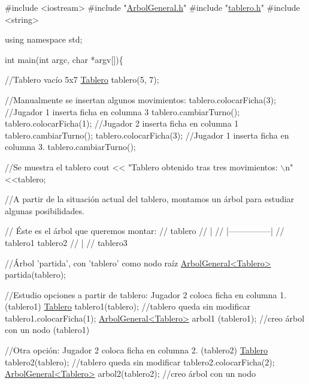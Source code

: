 \begin{DoxyCode}
\textcolor{preprocessor}{#include <iostream>}
\textcolor{preprocessor}{#include "\hyperlink{ArbolGeneral_8h}{ArbolGeneral.h}"}
\textcolor{preprocessor}{#include "\hyperlink{tablero_8h}{tablero.h}"}
\textcolor{preprocessor}{#include <string>}

\textcolor{keyword}{using namespace }std;


\textcolor{keywordtype}{int} main(\textcolor{keywordtype}{int} argc, \textcolor{keywordtype}{char} *argv[])\{

  \textcolor{comment}{//Tablero vacío 5x7}
    \hyperlink{classTablero}{Tablero} tablero(5, 7);

    \textcolor{comment}{//Manualmente se insertan algunos movimientos: }
    tablero.colocarFicha(3);  \textcolor{comment}{//Jugador 1 inserta ficha en columna 3}
    tablero.cambiarTurno();
    tablero.colocarFicha(1);  \textcolor{comment}{//Jugador 2 inserta ficha en columna 1}
    tablero.cambiarTurno();
    tablero.colocarFicha(3);  \textcolor{comment}{//Jugador 1 inserta ficha en columna 3.}
    tablero.cambiarTurno();
    
    \textcolor{comment}{//Se muestra el tablero }
    cout << \textcolor{stringliteral}{"Tablero obtenido tras tres movimientos: \(\backslash\)n"}<<tablero; 

    \textcolor{comment}{//A partir de la situación actual del tablero, montamos un árbol para estudiar algunas posibilidades. }

    \textcolor{comment}{// Éste es el árbol que queremos montar: }
    \textcolor{comment}{//        tablero}
    \textcolor{comment}{//          |}
    \textcolor{comment}{//      |---------------|}
    \textcolor{comment}{//    tablero1      tablero2}
    \textcolor{comment}{//                      |}
    \textcolor{comment}{//                  tablero3}


    \textcolor{comment}{//Árbol 'partida', con 'tablero' como nodo raíz}
    \hyperlink{classArbolGeneral}{ArbolGeneral<Tablero>} partida(tablero);

    \textcolor{comment}{//Estudio opciones a partir de tablero: Jugador 2 coloca ficha en columna 1. (tablero1)}
    \hyperlink{classTablero}{Tablero} tablero1(tablero);          \textcolor{comment}{//tablero queda sin modificar}
    tablero1.colocarFicha(1);   
    \hyperlink{classArbolGeneral}{ArbolGeneral<Tablero>} arbol1 (tablero1);  \textcolor{comment}{//creo árbol con un nodo (tablero1)}

    \textcolor{comment}{//Otra opción: Jugador 2 coloca ficha en columna 2. (tablero2)}
    \hyperlink{classTablero}{Tablero} tablero2(tablero);          \textcolor{comment}{//tablero queda sin modificar}
    tablero2.colocarFicha(2);
    \hyperlink{classArbolGeneral}{ArbolGeneral<Tablero>} arbol2(tablero2);   \textcolor{comment}{//creo árbol con un nodo}


\end{DoxyCode}
